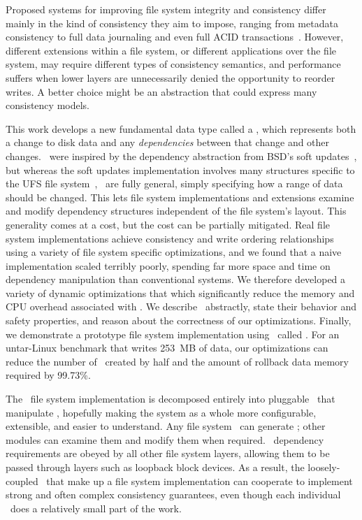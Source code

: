Proposed systems for improving file system integrity and consistency differ
 mainly in the kind of consistency they aim to impose, ranging from
 metadata consistency to full data journaling
 and even full ACID
 transactions~\cite{gal05transactional,liskov04transactional}.
%
However, different extensions within a file system, or different
 applications over the file system, may require different types of
 consistency semantics, and performance suffers when lower layers are
 unnecessarily denied the opportunity to reorder
 writes.
%
A better choice might be an abstraction that could express many consistency
 models.


This work develops a new fundamental data type called a \emph{\patch},
 which represents both a change to disk data and any \emph{dependencies}
 between that change and other changes. 
%
\Patches\ were inspired by the dependency abstraction from BSD's soft
 updates~\cite{ganger00soft}, but whereas the soft updates implementation
 involves many structures specific to the UFS file
 system~\cite{mckusick99soft}, \patches\ are fully general, simply
 specifying how a range of data should be changed.
%
This lets file system implementations and extensions examine and modify
 dependency structures independent of the file system's layout.
%
This generality comes at a cost, but the cost can be partially mitigated.
%
Real file system implementations achieve consistency and write ordering
 relationships using a variety of file system specific optimizations, and
 we found that a naive implementation scaled terribly poorly, spending far
 more space and time on dependency manipulation than conventional systems.
%
We therefore developed a variety of dynamic optimizations that which
 significantly reduce the memory and CPU overhead associated with \patches.
%
We describe \patches\ abstractly, state their behavior and safety
 properties, and reason about the correctness of our optimizations.
%
Finally, we demonstrate a prototype file system implementation using
 \patches\ called \Kudos.
%
For an untar-Linux benchmark that writes 253~MB of data, our optimizations
 can reduce the number of \patches\ created by half and the amount of
 rollback data memory required by 99.73\%. 


The \Kudos\ file system implementation is decomposed entirely into
 pluggable \modules\ that manipulate \patches, hopefully making the system
 as a whole more configurable, extensible, and easier to understand.
%
Any file system \module\ can generate \patches; other modules can examine
 them and modify them when required.
%
\Patch\ dependency requirements are obeyed by all other file system
 layers, allowing them to be passed through layers such as loopback block
 devices.
%
As a result, the loosely-coupled \modules\ that make up a file system
 implementation can cooperate to implement strong and often complex
 consistency guarantees, even though each individual \module\ does a
 relatively small part of the work.


